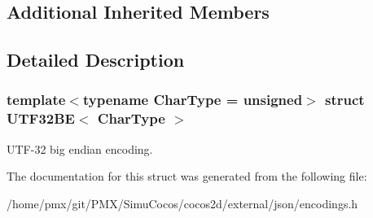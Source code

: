 \subsection*{Additional Inherited Members}


\subsection{Detailed Description}
\subsubsection*{template$<$typename Char\+Type = unsigned$>$\newline
struct U\+T\+F32\+B\+E$<$ Char\+Type $>$}

U\+T\+F-\/32 big endian encoding. 

The documentation for this struct was generated from the following file\+:\begin{DoxyCompactItemize}
\item 
/home/pmx/git/\+P\+M\+X/\+Simu\+Cocos/cocos2d/external/json/encodings.\+h\end{DoxyCompactItemize}
